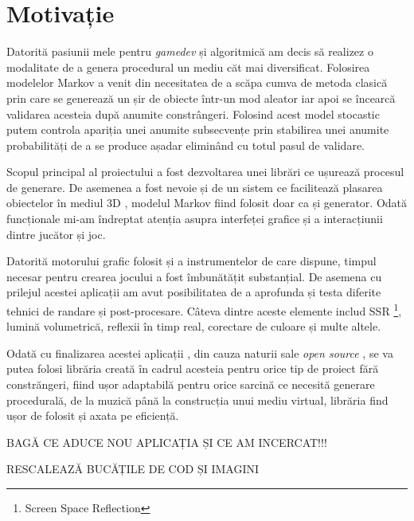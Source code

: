 \chapter*{Motivație} 

Datorită pasiunii mele pentru \textit{gamedev} și algoritmică am decis să realizez o modalitate de a genera procedural un mediu căt mai diversificat. Folosirea modelelor Markov a venit din necesitatea de a scăpa cumva de metoda clasică prin care se generează un șir de obiecte într-un mod aleator iar apoi se încearcă validarea acesteia după anumite constrângeri. Folosind acest model stocastic putem controla apariția unei anumite subsecvențe prin stabilirea unei anumite probabilități de a se produce așadar eliminând cu totul pasul de validare.\par

Scopul principal al proiectului a fost dezvoltarea unei librări ce ușurează procesul de generare. De asemenea a fost nevoie și de un sistem ce facilitează plasarea obiectelor în mediul 3D , modelul Markov fiind folosit doar ca și generator. Odată  funcționale mi-am îndreptat atenția asupra interfeței grafice și a interacțiunii dintre jucător și joc.\par

Datorită motorului grafic folosit și a instrumentelor de care dispune, timpul necesar pentru crearea jocului a fost îmbunătățit substanțial. De asemena cu prilejul acestei aplicații am avut posibilitatea de a aprofunda și testa diferite tehnici de randare și post-procesare. Câteva dintre aceste elemente includ SSR \footnote{Screen Space Reflection}, lumină volumetrică, reflexii în timp real, corectare de culoare și multe altele.\par

Odată cu finalizarea acestei aplicații , din cauza naturii sale \textit{open source} , se va putea folosi librăria creată în cadrul acesteia pentru orice tip de proiect fără constrăngeri, fiind ușor adaptabilă pentru orice sarcină ce necesită generare procedurală, de la muzică până la construcția unui mediu virtual, librăria find ușor de folosit și axata pe eficiență.\par

BAGĂ CE ADUCE NOU APLICAȚIA ȘI CE AM INCERCAT!!!

RESCALEAZĂ BUCĂȚILE DE COD ȘI IMAGINI